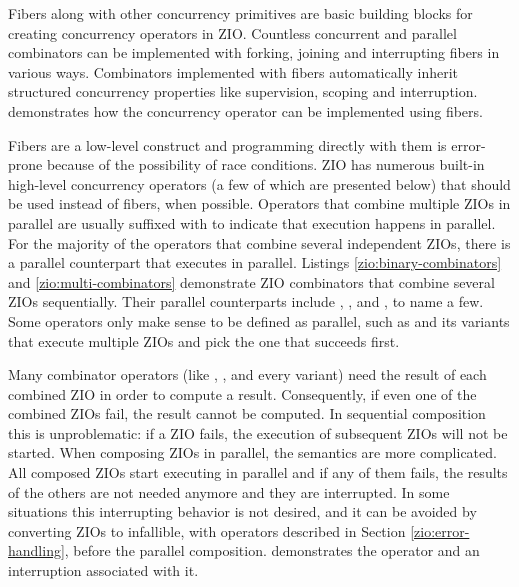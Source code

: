 Fibers along with other concurrency primitives are basic building blocks for creating concurrency operators in ZIO. Countless concurrent and parallel combinators can be implemented with forking, joining and interrupting fibers in various ways. Combinators implemented with fibers automatically inherit structured concurrency properties like supervision, scoping and interruption.  demonstrates how the  concurrency operator can be implemented using fibers.



Fibers are a low-level construct and programming directly with them is error-prone because of the possibility of race conditions. ZIO has numerous built-in high-level concurrency operators (a few of which are presented below) that should be used instead of fibers, when possible. Operators that combine multiple ZIOs in parallel are usually suffixed with  to indicate that execution happens in parallel. For the majority of the operators that combine several independent ZIOs, there is a parallel counterpart that executes in parallel. Listings \ref{zio:binary-combinators} and \ref{zio:multi-combinators} demonstrate ZIO combinators that combine several ZIOs sequentially. Their parallel counterparts include , , and , to name a few. Some operators only make sense to be defined as parallel, such as  and its variants that execute multiple ZIOs and pick the one that succeeds first.
  
Many combinator operators (like , , and every  variant) need the result of each combined ZIO in order to compute a result. Consequently, if even one of the combined ZIOs fail, the result cannot be computed. In sequential composition this is unproblematic: if a ZIO fails, the execution of subsequent ZIOs will not be started. When composing ZIOs in parallel, the semantics are more complicated. All composed ZIOs start executing in parallel and if any of them fails, the results of the others are not needed anymore and they are interrupted. In some situations this interrupting behavior is not desired, and it can be avoided by converting ZIOs to infallible, with operators described in Section \ref{zio:error-handling}, before the parallel composition.  demonstrates the  operator and an interruption associated with it.

